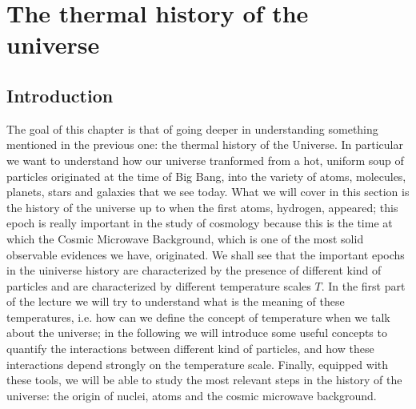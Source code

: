 \chapter{The thermal history of the universe}

\section{Introduction}
The goal of this chapter is that of going deeper in understanding something mentioned in the previous one: the thermal history of the Universe. In particular we want to understand how our universe tranformed from a hot, uniform soup of particles originated at the time of Big Bang, into the variety of atoms, molecules, planets, stars and galaxies that we see today. What we will cover in this section is the history of the universe up to when the first atoms, hydrogen, appeared; this epoch is really important in the study of cosmology because this is the time at which the Cosmic Microwave Background, which is one of the most solid observable evidences we have, originated. We shall see that the important epochs in the uiniverse history are characterized by the presence of different kind of particles and are characterized by different temperature scales $T$. In the first part of the lecture we will try to understand what is the meaning of these temperatures, i.e. how can we define the concept of temperature when 
we talk about the universe; in the following we will introduce some useful concepts to quantify the interactions between different kind of particles, and how these interactions depend strongly on the temperature scale. Finally, equipped with these tools, we will be able to study the most relevant steps in the history of the universe: the origin of nuclei, atoms and the cosmic microwave background. 

